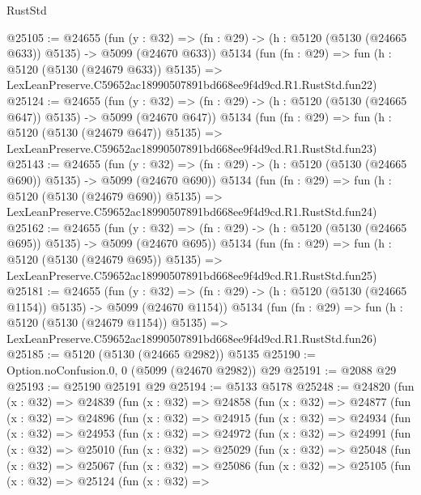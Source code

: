 \begin{lexlean}{RustStd}
\begin{coremodule}
@25105 := @24655
    (fun (y : @32) => (fn : @29) -> (h : @5120 (@5130 (@24665 @633)) @5135) -> @5099 (@24670 @633))
    @5134
    (fun (fn : @29) =>
    fun (h : @5120 (@5130 (@24679 @633)) @5135) =>
    LexLeanPreserve.C59652ac18990507891bd668ee9f4d9cd.R1.RustStd.fun22)
@25124 := @24655
    (fun (y : @32) => (fn : @29) -> (h : @5120 (@5130 (@24665 @647)) @5135) -> @5099 (@24670 @647))
    @5134
    (fun (fn : @29) =>
    fun (h : @5120 (@5130 (@24679 @647)) @5135) =>
    LexLeanPreserve.C59652ac18990507891bd668ee9f4d9cd.R1.RustStd.fun23)
@25143 := @24655
    (fun (y : @32) => (fn : @29) -> (h : @5120 (@5130 (@24665 @690)) @5135) -> @5099 (@24670 @690))
    @5134
    (fun (fn : @29) =>
    fun (h : @5120 (@5130 (@24679 @690)) @5135) =>
    LexLeanPreserve.C59652ac18990507891bd668ee9f4d9cd.R1.RustStd.fun24)
@25162 := @24655
    (fun (y : @32) => (fn : @29) -> (h : @5120 (@5130 (@24665 @695)) @5135) -> @5099 (@24670 @695))
    @5134
    (fun (fn : @29) =>
    fun (h : @5120 (@5130 (@24679 @695)) @5135) =>
    LexLeanPreserve.C59652ac18990507891bd668ee9f4d9cd.R1.RustStd.fun25)
@25181 := @24655
    (fun (y : @32) =>
    (fn : @29) -> (h : @5120 (@5130 (@24665 @1154)) @5135) -> @5099 (@24670 @1154))
    @5134
    (fun (fn : @29) =>
    fun (h : @5120 (@5130 (@24679 @1154)) @5135) =>
    LexLeanPreserve.C59652ac18990507891bd668ee9f4d9cd.R1.RustStd.fun26)
@25185 := @5120 (@5130 (@24665 @2982)) @5135
@25190 := Option.noConfusion.{0, 0} (@5099 (@24670 @2982)) @29
@25191 := @2088 @29
@25193 := @25190 @25191 @29
@25194 := @5133 @5178
@25248 := @24820
    (fun (x : @32) =>
    @24839
      (fun (x : @32) =>
      @24858
        (fun (x : @32) =>
        @24877
          (fun (x : @32) =>
          @24896
            (fun (x : @32) =>
            @24915
              (fun (x : @32) =>
              @24934
                (fun (x : @32) =>
                @24953
                  (fun (x : @32) =>
                  @24972
                    (fun (x : @32) =>
                    @24991
                      (fun (x : @32) =>
                      @25010
                        (fun (x : @32) =>
                        @25029
                          (fun (x : @32) =>
                          @25048
                            (fun (x : @32) =>
                            @25067
                              (fun (x : @32) =>
                              @25086
                                (fun (x : @32) =>
                                @25105
                                  (fun (x : @32) =>
                                  @25124
                                    (fun (x : @32) =>

\end{coremodule}
\end{lexlean}
